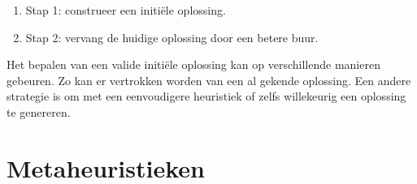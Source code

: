 %
\begin{enumerate}
    \item Stap 1: construeer een initi\"ele oplossing.
    \item Stap 2: vervang de huidige oplossing door een betere buur.
\end{enumerate}
%

Het bepalen van een valide initi\"ele oplossing kan op verschillende manieren gebeuren. 
Zo kan er vertrokken worden van een al gekende oplossing. 
Een andere strategie is om met een eenvoudigere heuristiek of zelfs willekeurig een oplossing te genereren.


\section{Metaheuristieken}